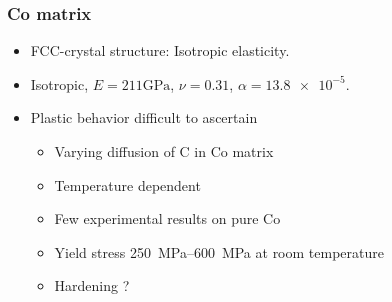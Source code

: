 \documentclass[11pt]{beamer} %
\begin{document}
\begin{frame}
 \frametitle{Co matrix}
  \begin{itemize}
  \item FCC-crystal structure: Isotropic elasticity.
  \item Isotropic, $E = 211\si{\giga\pascal}$, $\nu = 0.31$, $\alpha = \num{13.8e-5}$.
  \item Plastic behavior difficult to ascertain
   \begin{itemize}
    \item Varying diffusion of C in Co matrix
    \item Temperature dependent
    \item Few experimental results on pure Co
    \item Yield stress \SIrange{250}{600}{\mega\pascal} at room temperature
    \item Hardening ?
   \end{itemize}
  \end{itemize}
\end{frame}
\end{document}
